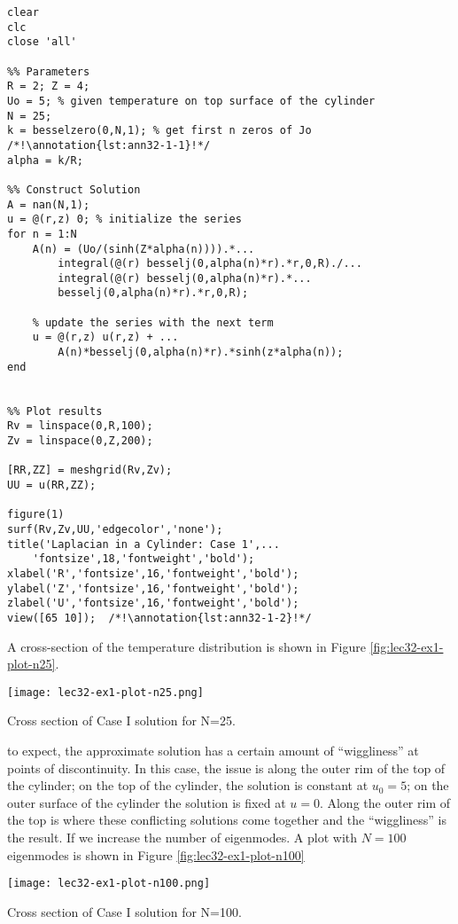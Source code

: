 \begin{lstlisting}[name=lec32-ex1, style=myMatlab]
clear
clc
close 'all'

%% Parameters
R = 2; Z = 4;
Uo = 5; % given temperature on top surface of the cylinder
N = 25;
k = besselzero(0,N,1); % get first n zeros of Jo    /*!\annotation{lst:ann32-1-1}!*/
alpha = k/R;

%% Construct Solution
A = nan(N,1);
u = @(r,z) 0; % initialize the series
for n = 1:N
    A(n) = (Uo/(sinh(Z*alpha(n)))).*...
        integral(@(r) besselj(0,alpha(n)*r).*r,0,R)./...
        integral(@(r) besselj(0,alpha(n)*r).*...
        besselj(0,alpha(n)*r).*r,0,R);
    
    % update the series with the next term
    u = @(r,z) u(r,z) + ...
        A(n)*besselj(0,alpha(n)*r).*sinh(z*alpha(n));    
end


%% Plot results
Rv = linspace(0,R,100);
Zv = linspace(0,Z,200);

[RR,ZZ] = meshgrid(Rv,Zv);
UU = u(RR,ZZ);

figure(1)
surf(Rv,Zv,UU,'edgecolor','none');
title('Laplacian in a Cylinder: Case 1',...
    'fontsize',18,'fontweight','bold');
xlabel('R','fontsize',16,'fontweight','bold');
ylabel('Z','fontsize',16,'fontweight','bold');
zlabel('U','fontsize',16,'fontweight','bold');
view([65 10]);  /*!\annotation{lst:ann32-1-2}!*/
\end{lstlisting}
A cross-section of the temperature distribution is shown in Figure \ref{fig:lec32-ex1-plot-n25}. 
\begin{marginfigure}
\texttt{[image: lec32-ex1-plot-n25.png]}
\caption{Cross section of Case I solution for N=25.}
\label{fig:lec32-ex1-plot-n25}
\end{marginfigure}
 to expect, the approximate solution has a certain amount of ``wiggliness'' at points of discontinuity.  In this case, the issue is along the outer rim of the top of the cylinder; on the top of the cylinder, the solution is constant at $u_0 = 5$; on the outer surface of the cylinder the solution is fixed at $u = 0$.  Along the outer rim of the top is where these conflicting solutions come together and the ``wiggliness'' is the result.  If we increase the number of eigenmodes.  A plot with $N=100$ eigenmodes is shown in Figure \ref{fig:lec32-ex1-plot-n100}
\begin{marginfigure}
\texttt{[image: lec32-ex1-plot-n100.png]}
\caption{Cross section of Case I solution for N=100.}
\label{fig:lec32-ex1-plot-n100}
\end{marginfigure}

